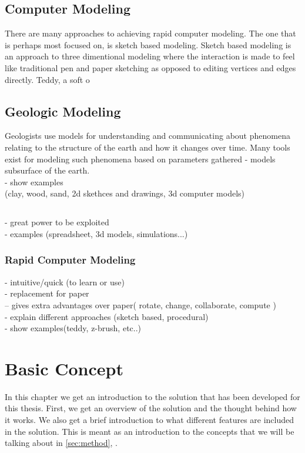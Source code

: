 \documentclass[a4paper,12pt]{report}
\newcommand{\secref}[1]{\autoref{#1}, \nameref{#1}}
\begin{document}
\section{Computer Modeling}
There are many approaches to achieving rapid computer modeling. The one that is perhaps most focused on, is sketch based modeling. Sketch based modeling is an approach to three dimentional modeling where the interaction is made to feel like traditional pen and paper sketching as opposed to editing vertices and edges directly. Teddy, a soft o

\section{Geologic Modeling}
Geologists use models for understanding and communicating about phenomena relating to the structure of the earth and how it changes over time. Many tools exist for modeling such phenomena based on parameters gathered 
- models subsurface of the earth.\\
- show examples\\(clay, wood, sand, 2d skethces and drawings, 3d computer models)

\section{}
- great power to be exploited\\
- examples (spreadsheet, 3d models, simulations...)\\
\subsection{Rapid Computer Modeling}
- intuitive/quick (to learn or use)\\
- replacement for paper\\
  -- gives extra advantages over paper( rotate, change, collaborate, compute )\\
- explain different approaches (sketch based, procedural)\\
- show examples(teddy, z-brush, etc..)\\

\clearpage
\chapter{Basic Concept}
In this chapter we get an introduction to the solution that has been developed for this thesis. First, we get an overview of the solution and the thought behind how it works. We also get a brief introduction to what different features are included in the solution. This is meant as an introduction to the concepts that we will be talking about in \secref{sec:method}.
\label{sec:concept}
\end{document}
